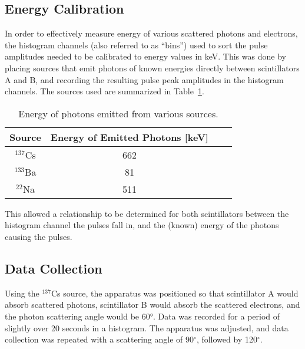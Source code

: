 \documentclass[prb,preprint,groupaddress,showpacs,superbib,floats]{revtex4-1}
\begin{document}
\subsection{Energy Calibration}
In order to effectively measure energy of various scattered photons and electrons, the histogram channels (also referred to as “bins”) used to sort the pulse amplitudes needed to be calibrated to energy values in keV. This was done by placing sources that emit photons of known energies directly between scintillators A and B, and recording the resulting pulse peak amplitudes in the histogram channels. The sources used are summarized in Table~\ref{calTable}. 

%

\begin{table}[h]
\begin{ruledtabular}
\begin{tabular}{cccc}
	
\textbf{Source} & \textbf{Energy of Emitted Photons [keV]} \\ 
\hline
$^{137}$Cs & 662 \\ 
$^{133}$Ba & 81 \\ 
$^{22}$Na & 511 \\ 

\end{tabular}
\end{ruledtabular}
\caption{Energy of photons emitted from various sources. }
\label{calTable}
\end{table}

This allowed a relationship to be determined for both scintillators between the histogram channel the pulses fall in, and the (known) energy of the photons causing the pulses. 

\subsection{Data Collection}
Using the $^{137}$Cs source, the apparatus was positioned so that scintillator A would absorb scattered photons, scintillator B would absorb the scattered electrons, and the photon scattering angle would be 60°. Data was recorded for a period of slightly over 20 seconds in a histogram. The apparatus was adjusted, and data collection was repeated with a scattering angle of 90$^{\circ}$, followed by 120$^{\circ}$. 
\end{document}

